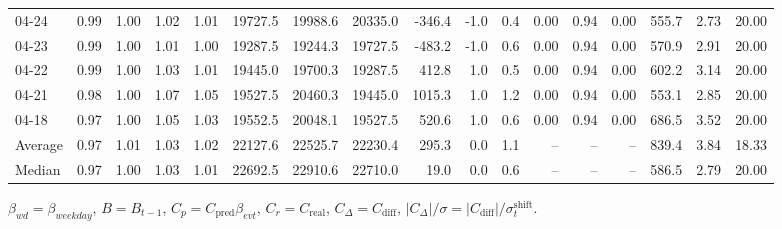 \begin{threeparttable}
{\begin{tabular}{lrrrrrrrrrrrrrrrr}
  04-24 &         0.99 &           1.00 &          1.02 &          1.01 & 19727.5 & 19988.6 & 20335.0 &     -346.4 &                     -1.0 &                 0.4 &       0.00 &      0.94 &           0.00 &            555.7 &            2.73 &                  20.00 \\
  04-23 &         0.99 &           1.00 &          1.01 &          1.00 & 19287.5 & 19244.3 & 19727.5 &     -483.2 &                     -1.0 &                 0.6 &       0.00 &      0.94 &           0.00 &            570.9 &            2.91 &                  20.00 \\
  04-22 &         0.99 &           1.00 &          1.03 &          1.01 & 19445.0 & 19700.3 & 19287.5 &      412.8 &                      1.0 &                 0.5 &       0.00 &      0.94 &           0.00 &            602.2 &            3.14 &                  20.00 \\
  04-21 &         0.98 &           1.00 &          1.07 &          1.05 & 19527.5 & 20460.3 & 19445.0 &     1015.3 &                      1.0 &                 1.2 &       0.00 &      0.94 &           0.00 &            553.1 &            2.85 &                  20.00 \\
  04-18 &         0.97 &           1.00 &          1.05 &          1.03 & 19552.5 & 20048.1 & 19527.5 &      520.6 &                      1.0 &                 0.6 &       0.00 &      0.94 &           0.00 &            686.5 &            3.52 &                  20.00 \\
Average &         0.97 &           1.01 &          1.03 &          1.02 & 22127.6 & 22525.7 & 22230.4 &      295.3 &                      0.0 &                 1.1 &         -- &        -- &             -- &            839.4 &            3.84 &                  18.33 \\
 Median &         0.97 &           1.00 &          1.03 &          1.01 & 22692.5 & 22910.6 & 22710.0 &       19.0 &                      0.0 &                 0.6 &         -- &        -- &             -- &            586.5 &            2.79 &                  20.00 \\
\bottomrule
\end{tabular}
}
\begin{tablenotes}\footnotesize
\item $\beta_{wd}=\beta_{weekday}$, $B=B_{t-1}$,
$C_p=C_{\text{pred}}\beta_{evt}$, $C_r=C_{\text{real}}$,
$C_\Delta=C_{\text{diff}}$, $|C_\Delta|/\sigma=|C_{\text{diff}}|/\sigma_t^{\text{shift}}$.
\end{tablenotes}
\end{threeparttable}
\endgroup
